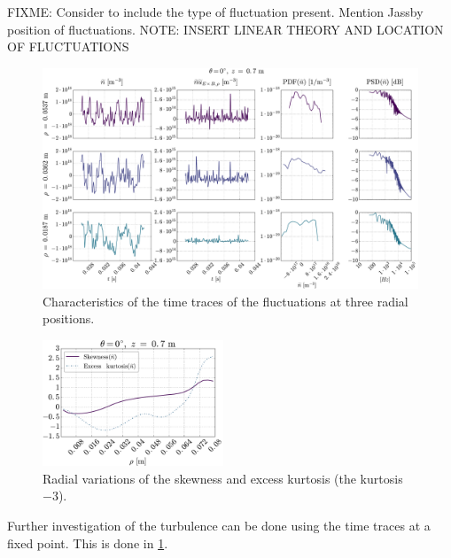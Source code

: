 FIXME: Consider to include the type of fluctuation present.
Mention Jassby position of fluctuations.
NOTE: INSERT LINEAR THEORY AND LOCATION OF FLUCTUATIONS
%
\begin{figure}[htb]
    \centering
    \includegraphics[width=1.0\textwidth]{fig/results/combinedPlots/008T}
    \caption{Characteristics of the time traces of the fluctuations at three radial positions.}
    \label{fig:combinedPlots008}
\end{figure}
%
%
\begin{figure}
    \begin{center}
        \includegraphics[width=0.48\textwidth]{fig/results/skewKurt/008T}
    \end{center}
    \caption{Radial variations of the skewness and excess kurtosis (the kurtosis $-3$).}
    \label{fig:skewKurt008}
\end{figure}
%
Further investigation of the turbulence can be done using the time traces at a fixed point.
This is done in \cref{fig:combinedPlots008}.

